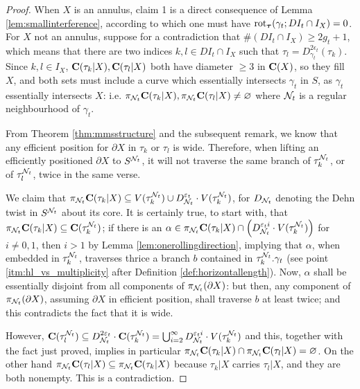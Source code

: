 \begin{proof}
When $X$ is an annulus, claim 1 is a direct consequence of Lemma \ref{lem:smallinterference}, according to which one must have $\mathrm{rot}_{\bm\tau}(\gamma_t; DI_t\cap I_X)=0$. For $X$ not an annulus, suppose for a contradiction that $\#\left(DI_t\cap I_X\right)\geq 2g_t+1$, which means that there are two indices $k,l\in DI_t\cap I_X$ such that $\tau_l=D_{\gamma_t}^{2\epsilon_t}(\tau_k)$. Since $k,l\in I_X$, $\mathbf C(\tau_k|X),\mathbf C(\tau_l|X)$ both have diameter $\geq 3$ in $\mathbf C(X)$, so they fill $X$, and both sets must include a curve which essentially intersects $\gamma_t$ in $S$, as $\gamma_t$ essentially intersects $X$: i.e. $\pi_{{\mathcal N}_t}\mathbf C(\tau_k|X),\pi_{{\mathcal N}_t}\mathbf C(\tau_l|X)\not=\varnothing$ where ${\mathcal N}_t$ is a regular neighbourhood of $\gamma_t$.

From Theorem \ref{thm:mmsstructure} and the subsequent remark, we know that any efficient position for $\partial X$ in $\tau_k$ or $\tau_l$ is wide. Therefore, when lifting an efficiently positioned $\partial X$ to $S^{{\mathcal N}_t}$, it will not traverse the same branch of $\tau_k^{{\mathcal N}_t}$, or of $\tau_l^{{\mathcal N}_t}$, twice in the same verse.

We claim that $\pi_{{\mathcal N}_t}\mathbf C(\tau_k|X)\subseteq V(\tau_k^{{\mathcal N}_t})\cup D_{{\mathcal N}_t}^{\varepsilon_t}\cdot V(\tau_k^{{\mathcal N}_t})$, for $D_{{\mathcal N}_t}$ denoting the Dehn twist in $S^{{\mathcal N}_t}$ about its core. It is certainly true, to start with, that $\pi_{{\mathcal N}_t}\mathbf C(\tau_k|X)\subseteq \mathbf C(\tau_k^{{\mathcal N}_t})$; if there is an $\alpha\in \pi_{{\mathcal N}_t}\mathbf C(\tau_k|X) \cap \left(D_{{\mathcal N}_t}^{\varepsilon_t i}\cdot V(\tau_k^{{\mathcal N}_t})\right)$ for $i\not=0,1$, then $i>1$ by Lemma \ref{lem:onerollingdirection}, implying that $\alpha$, when embedded in $\tau_k^{{\mathcal N}_t}$, traverses thrice a branch $b$ contained in $\tau_k^{{\mathcal N}_t}.\gamma_t$ (see point \ref{itm:hl_vs_multiplicity} after Definition \ref{def:horizontallength}). Now, $\alpha$ shall be essentially disjoint from all components of $\pi_{{\mathcal N}_t}(\partial X)$: but then, any component of $\pi_{{\mathcal N}_t}(\partial X)$, assuming $\partial X$ in efficient position, shall traverse $b$ at least twice; and this contradicts the fact that it is wide.

However, $\mathbf C(\tau_l^{{\mathcal N}_t}) \subseteq D_{{\mathcal N}_t}^{2\varepsilon_t} \cdot \mathbf C(\tau_k^{{\mathcal N}_t})= \bigcup_{i=2}^\infty D_{{\mathcal N}_t}^{\varepsilon_t i}\cdot V(\tau_k^{{\mathcal N}_t})$ and this, together with the fact just proved, implies in particular $\pi_{{\mathcal N}_t}\mathbf C(\tau_k|X)\cap \pi_{{\mathcal N}_t}\mathbf C(\tau_l|X)=\varnothing$. On the other hand $\pi_{{\mathcal N}_t}\mathbf C(\tau_l|X)\subseteq \pi_{{\mathcal N}_t}\mathbf C(\tau_k|X)$ because $\tau_k|X$ carries $\tau_l|X$, and they are both nonempty. This is a contradiction.


\end{proof}
